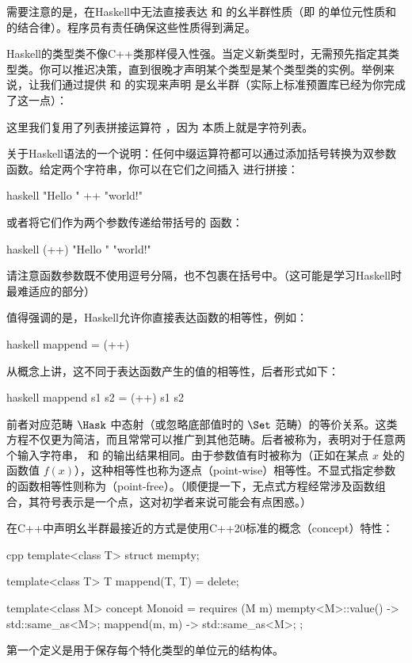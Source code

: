需要注意的是，在Haskell中无法直接表达  和  的幺半群性质（即  的单位元性质和  的结合律）。程序员有责任确保这些性质得到满足。

Haskell的类型类不像C++类那样侵入性强。当定义新类型时，无需预先指定其类型类。你可以推迟决策，直到很晚才声明某个类型是某个类型类的实例。举例来说，让我们通过提供  和  的实现来声明  是幺半群（实际上标准预置库已经为你完成了这一点）：

这里我们复用了列表拼接运算符 \code{(++)}，因为  本质上就是字符列表。

关于Haskell语法的一个说明：任何中缀运算符都可以通过添加括号转换为双参数函数。给定两个字符串，你可以在它们之间插入 \code{++} 进行拼接：

\begin{snip}{haskell}
"Hello " ++ "world!"
\end{snip}
或者将它们作为两个参数传递给带括号的 \code{(++)} 函数：

\begin{snip}{haskell}
(++) "Hello " "world!"
\end{snip}
请注意函数参数既不使用逗号分隔，也不包裹在括号中。（这可能是学习Haskell时最难适应的部分）

值得强调的是，Haskell允许你直接表达函数的相等性，例如：

\begin{snip}{haskell}
mappend = (++)
\end{snip}
从概念上讲，这不同于表达函数产生的值的相等性，后者形式如下：

\begin{snip}{haskell}
mappend s1 s2 = (++) s1 s2
\end{snip}
前者对应范畴 $\Hask$ 中态射（或忽略底部值时的 $\Set$ 范畴）的等价关系。这类方程不仅更为简洁，而且常常可以推广到其他范畴。后者被称为，表明对于任意两个输入字符串， 和 \code{(++)} 的输出结果相同。由于参数值有时被称为（正如在某点 $x$ 处的函数值 $f(x)$），这种相等性也称为逐点（point-wise）相等性。不显式指定参数的函数相等性则称为（point-free）。（顺便提一下，无点式方程经常涉及函数组合，其符号表示是一个点，这对初学者来说可能会有点困惑。）

在C++中声明幺半群最接近的方式是使用C++20标准的概念（concept）特性：

\begin{snip}{cpp}
template<class T>
struct mempty;

template<class T>
T mappend(T, T) = delete;

template<class M>
concept Monoid = requires (M m) {
    { mempty<M>::value() } -> std::same_as<M>;
    { mappend(m, m) } -> std::same_as<M>;
};
\end{snip}
第一个定义是用于保存每个特化类型的单位元的结构体。

